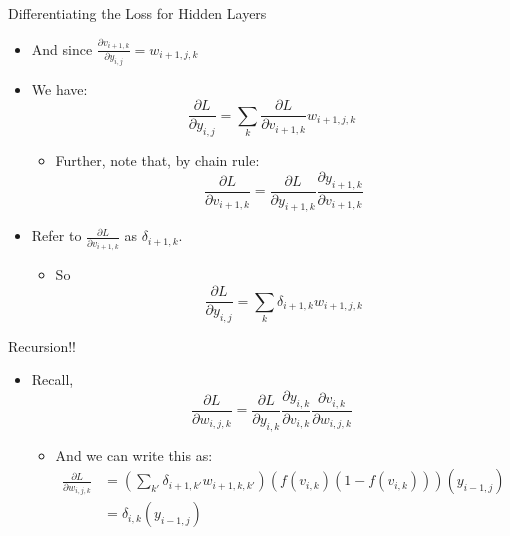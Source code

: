 \documentclass[aspectratio=169]{beamer}
\begin{document}
\begin{frame}{Differentiating the Loss for Hidden Layers}
\begin{itemize}
	\item And since $\frac{\partial  v_{i+1,k}}{\partial y_{i,j}} = w_{i+1,j,k}$ 
	\item We have:
		$$\frac{\partial L}{\partial y_{i,j}} = \sum_{k} \frac{\partial L}{\partial v_{i+1,k}}
                        w_{i+1,j,k}$$
	\begin{itemize}
	\item Further, note that, by chain rule:
		 $$\frac{\partial L}{\partial v_{i+1,k}} = \frac{\partial L}{\partial y_{i+1,k}} 
                                                \frac{\partial y_{i+1,k}}{\partial v_{i+1,k}}$$
	\end{itemize}
	\item Refer to $\frac{\partial L}{\partial v_{i+1,k}}$ as $\delta_{i+1,k}$.
	\begin{itemize}
	\item So
		$$\frac{\partial L}{\partial y_{i,j}} = \sum_{k} \delta_{i+1,k}
                        w_{i+1,j,k}$$
	\end{itemize}
\end{itemize}
\end{frame}
\begin{frame}{Recursion!!}
\begin{itemize}
	\item Recall, 
	$$ \frac{\partial L}{\partial w_{i,j,k}} = \frac{\partial L}{\partial y_{i,k}} 
						\frac{\partial y_{i,k}}{\partial v_{i,k}}
						\frac{\partial v_{i,k}}{\partial w_{i,j,k}}$$
	\begin{itemize}
	\item And we can write this as:
	\begin{align} \frac{\partial L}{\partial w_{i,j,k}} &= 
		\left( \sum_{k'} \delta_{i+1,k'} w_{i+1,k,k'} \right)  
		\left( f(v_{i,k})(1 - f(v_{i,k})) \right)
			\left( y_{i-1,j} \right) \nonumber \\	
		&= \delta_{i,k} \left( y_{i-1,j} \right) \nonumber \end{align}
	\end{itemize}
\end{itemize}
\end{frame}
\end{document}
